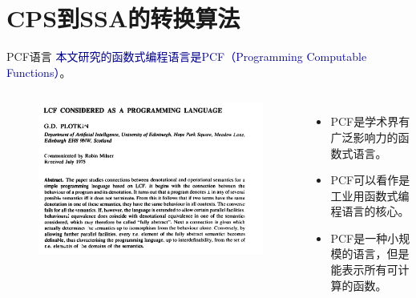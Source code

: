
\section{CPS到SSA的转换算法}

\begin{frame}{PCF语言}
    \textcolor{DarkBlue}{本文研究的函数式编程语言是PCF（Programming Computable Functions）}。
    \begin{columns}[t, onlytextwidth]
        \begin{figure}
            \centering
            \includegraphics[width=\linewidth]{figures/pcf.jpg}
          \end{figure}
        \begin{itemize}
        \item PCF是学术界有广泛影响力的函数式语言。
        \item PCF可以看作是工业用函数式编程语言的核心。
        \item PCF是一种小规模的语言，但是能表示所有可计算的函数。
        \end{itemize}
    \end{columns}
\end{frame}


